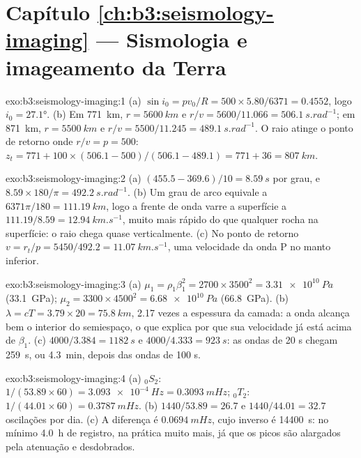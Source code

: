 \section*{Capítulo \ref{ch:b3:seismology-imaging} --- Sismologia e imageamento da Terra}

\begin{solution}{exo:b3:seismology-imaging:1}
(a) $\sin i_0 = pv_0/R = 500\times5.80/6371 = 0.4552$, logo $i_0 = \ang{27.1}$.
(b) Em \qty{771}{km}, $r = \qty{5600}{km}$ e $r/v = 5600/11.066 =
\qty{506.1}{s.rad^{-1}}$; em \qty{871}{km}, $r = \qty{5500}{km}$ e $r/v =
5500/11.245 = \qty{489.1}{s.rad^{-1}}$. O raio atinge o ponto de retorno onde $r/v = p = 500$:
$z_t = 771 + 100\times(506.1 - 500)/(506.1 - 489.1) = 771 + 36 =
\qty{807}{km}$.
\end{solution}

\begin{solution}{exo:b3:seismology-imaging:2}
(a) $(455.5 - 369.6)/10 = \qty{8.59}{s}$ por grau, e
$8.59\times180/\pi = \qty{492.2}{s.rad^{-1}}$. (b) Um grau de arco equivale a
$6371\pi/180 = \qty{111.19}{km}$, logo a frente de onda varre a superfície a
$111.19/8.59 = \qty{12.94}{km.s^{-1}}$, muito mais rápido do que qualquer rocha na
superfície: o raio chega quase verticalmente. (c) No ponto de retorno $v = r_t/p =
5450/492.2 = \qty{11.07}{km.s^{-1}}$, uma velocidade da onda P no manto inferior.
\end{solution}

\begin{solution}{exo:b3:seismology-imaging:3}
(a) $\mu_1 = \rho_1\beta_1^2 = 2700\times3500^2 = \qty{3.31e10}{Pa}$
(\qty{33.1}{GPa}); $\mu_2 = 3300\times4500^2 = \qty{6.68e10}{Pa}$
(\qty{66.8}{GPa}). (b) $\lambda = cT = 3.79\times20 = \qty{75.8}{km}$, 2.17
vezes a espessura da camada: a onda alcança bem o interior do semiespaço, o que
explica por que sua velocidade já está acima de $\beta_1$. (c) $4000/3.384 = \qty{1182}{s}$ e
$4000/4.333 = \qty{923}{s}$: as ondas de 20 s chegam \qty{259}{s}, ou
\qty{4.3}{min}, depois das ondas de 100 s.
\end{solution}

\begin{solution}{exo:b3:seismology-imaging:4}
(a) ${}_0S_2$: $1/(53.89\times60) = \qty{3.093e-4}{Hz} = \qty{0.3093}{mHz}$;
${}_0T_2$: $1/(44.01\times60) = \qty{0.3787}{mHz}$. (b) $1440/53.89 = 26.7$
e $1440/44.01 = 32.7$ oscilações por dia. (c) A diferença é
$\qty{0.0694}{mHz}$, cujo inverso é \qty{14400}{s}: no mínimo \qty{4.0}{h} de
registro, na prática muito mais, já que os picos são alargados pela atenuação e
desdobrados.
\end{solution}

